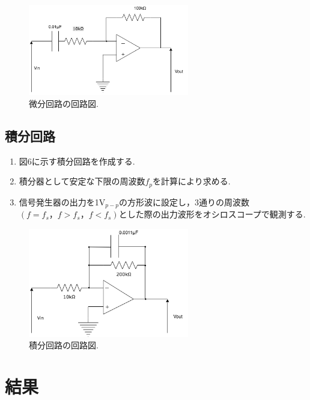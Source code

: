 \documentclass[twocolumn, 10pt,a4j]{jsarticle}
\begin{document}
        \begin{figure}[]
          \begin{center}
              \includegraphics[width=7cm]{../img/bibunkairo.png}
              \caption{微分回路の回路図.}
          \end{center}
        \end{figure}
    
    \subsection{積分回路}
        \begin{enumerate}
          \item 図6に示す積分回路を作成する. \\
          \item 積分器として安定な下限の周波数$f_{p}$を計算により求める. \\
          \item 信号発生器の出力を1V$_{p-p}$の方形波に設定し，3通りの周波数$(f=f_{s}，f > f_{s}，f < f_{s})$とした際の出力波形をオシロスコープで観測する.
        \end{enumerate}


        \begin{figure}[]
          \begin{center}
              \includegraphics[width=7cm]{../img/sekibun_kairo_.png}
              \caption{積分回路の回路図.}
          \end{center}
        \end{figure}


\section{結果}
\end{document}
